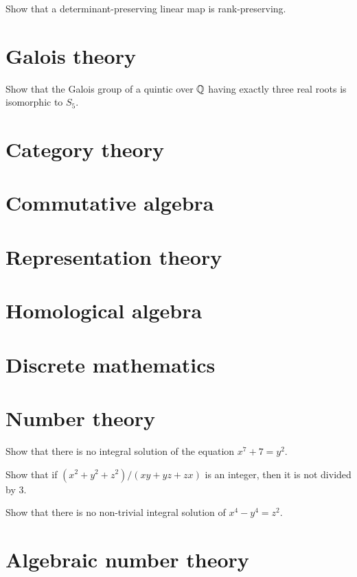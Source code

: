 \documentclass[11pt]{article}
\begin{document}
	\begin{prb}
	Show that a determinant-preserving linear map is rank-preserving.
	\end{prb}




\section{Galois theory}

	\begin{prb}
	Show that the Galois group of a quintic over $\mathbb{Q}$ having exactly three real roots is isomorphic to $S_5$.
	\end{prb}


\section{Category theory}
\section{Commutative algebra}
\section{Representation theory}
\section{Homological algebra}
\section{Discrete mathematics}
\section{Number theory}
	\begin{prb}
	Show that there is no integral solution of the equation $x^7+7=y^2$.
	\end{prb}

	\begin{prb}
	Show that if $(x^2+y^2+z^2)/(xy+yz+zx)$ is an integer, then it is not divided by 3.
	\end{prb}
	
	\begin{prb}
	Show that there is no non-trivial integral solution of $x^4-y^4=z^2$.
	\end{prb}

\section{Algebraic number theory}
\end{document}
